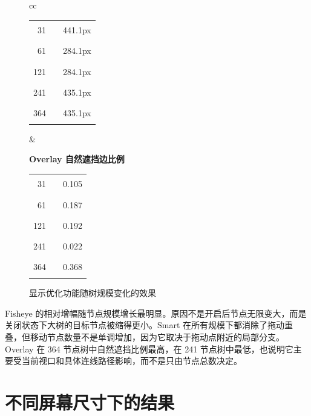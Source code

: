 \documentclass[11pt,a4paper,oneside,extrafontsizes]{memoir}
\begin{document}
\begin{center}
\begin{figure}[htbp]
\begin{tabular}{cc}
\begin{minipage}[t]{0.46\textwidth}
\begin{tabular}{@{}r l r@{}}
31 & \textcolor{blue!70!black}{\rule{0.2000\textwidth}{1.1ex}} & 441.1px \\
61 & \textcolor{blue!70!black}{\rule{0.1288\textwidth}{1.1ex}} & 284.1px \\
121 & \textcolor{blue!70!black}{\rule{0.1288\textwidth}{1.1ex}} & 284.1px \\
241 & \textcolor{blue!70!black}{\rule{0.1973\textwidth}{1.1ex}} & 435.1px \\
364 & \textcolor{blue!70!black}{\rule{0.1973\textwidth}{1.1ex}} & 435.1px \\
\end{tabular}
\end{minipage}
&
\begin{minipage}[t]{0.46\textwidth}
\centering
\textbf{Overlay 自然遮挡边比例}\\[-0.2em]

\begin{tabular}{@{}r l r@{}}
31 & \textcolor{blue!70!black}{\rule{0.0572\textwidth}{1.1ex}} & 0.105 \\
61 & \textcolor{blue!70!black}{\rule{0.1017\textwidth}{1.1ex}} & 0.187 \\
121 & \textcolor{blue!70!black}{\rule{0.1043\textwidth}{1.1ex}} & 0.192 \\
241 & \textcolor{blue!70!black}{\rule{0.0180\textwidth}{1.1ex}} & 0.022 \\
364 & \textcolor{blue!70!black}{\rule{0.2000\textwidth}{1.1ex}} & 0.368 \\
\end{tabular}
\end{minipage}
\end{tabular}
\caption{显示优化功能随树规模变化的效果}
\label{fig:display-size-metrics}
\end{figure}

\end{center}

Fisheye 的相对增幅随节点规模增长最明显。原因不是开启后节点无限变大，而是关闭状态下大树的目标节点被缩得更小。Smart 在所有规模下都消除了拖动重叠，但移动节点数量不是单调增加，因为它取决于拖动点附近的局部分支。Overlay 在 364 节点树中自然遮挡比例最高，在 241 节点树中最低，也说明它主要受当前视口和具体连线路径影响，而不是只由节点总数决定。

\section{不同屏幕尺寸下的结果}
\end{document}
